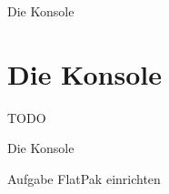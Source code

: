 
\begin{frame}{Die Konsole}
    \section{Die Konsole}\label{sec:die-konsole}

    TODO


\end{frame}


\begin{frame}{Die Konsole}

    \vspace{0.5cm}
    \begin{alertblock}{Aufgabe}
        FlatPak einrichten
    \end{alertblock}

\end{frame}